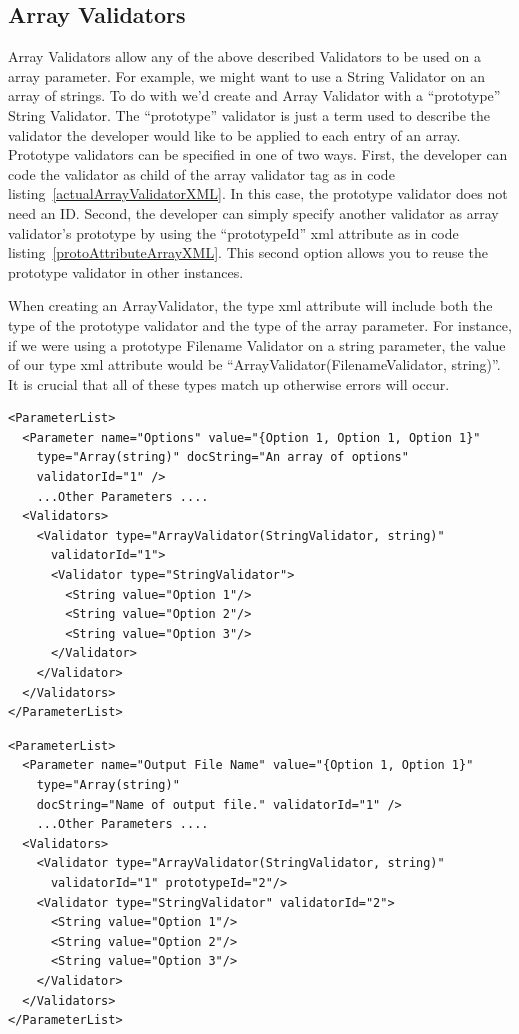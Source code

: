 \subsection{Array Validators}
Array Validators allow any of the above described Validators to be used on a array parameter. For example, we might want to use a
String Validator on an array of strings. To do with we'd create and Array Validator with a ``prototype'' String Validator. The 
``prototype'' validator is just a term used to describe the validator the developer would like to be applied to each entry of an
array. Prototype validators can be specified in one of two ways. First, the developer can code the validator as child of the array validator
tag as in code listing~\ref{actualArrayValidatorXML}. In this case, the prototype validator does not need an ID. 
Second, the developer can simply specify another validator as array validator's  prototype by using the
``prototypeId'' xml attribute as in code listing~\ref{protoAttributeArrayXML}. This second option allows you to reuse the prototype validator in other instances.

When creating an ArrayValidator, the type xml attribute will include both the type of the prototype validator and the type of the array
parameter. For instance, if we were using a prototype Filename Validator on a string parameter, the value of our type xml attribute would
be ``ArrayValidator(FilenameValidator, string)''. It is crucial that all of these types match up otherwise errors will occur.

\begin{lstlisting}[caption={Example usage of an Array Validator in which the prototype validator is declared as a child of the array validator}, label=actualArrayValidatorXML]
<ParameterList>
  <Parameter name="Options" value="{Option 1, Option 1, Option 1}" 
    type="Array(string)" docString="An array of options" 
    validatorId="1" />
    ...Other Parameters ....
  <Validators>
    <Validator type="ArrayValidator(StringValidator, string)" 
      validatorId="1">
      <Validator type="StringValidator">
        <String value="Option 1"/>
        <String value="Option 2"/>
        <String value="Option 3"/>
      </Validator>
    </Validator>
  </Validators>
</ParameterList>
\end{lstlisting}

\begin{lstlisting}[caption={Example usage of an Array Validator in which the prototype is specified usnig the prototypeId xml attribute}, label=protoAttributeArrayXML]
<ParameterList>
  <Parameter name="Output File Name" value="{Option 1, Option 1}" 
    type="Array(string)" 
    docString="Name of output file." validatorId="1" />
    ...Other Parameters ....
  <Validators>
    <Validator type="ArrayValidator(StringValidator, string)" 
      validatorId="1" prototypeId="2"/>
    <Validator type="StringValidator" validatorId="2">
      <String value="Option 1"/>
      <String value="Option 2"/>
      <String value="Option 3"/>
    </Validator>
  </Validators>
</ParameterList>
\end{lstlisting}

